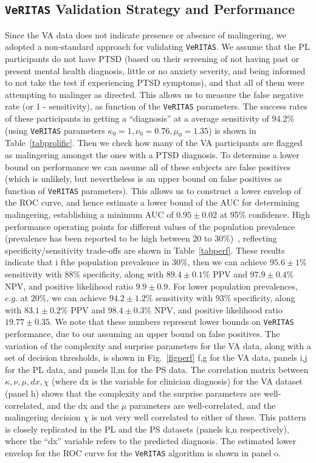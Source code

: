 \documentclass[onecolumn,10pt]{IEEEtran}
\def\vrts{\texttt{VeRITAS}\xspace}
\begin{document}
\subsection*{\vrts Validation Strategy and Performance}
Since the VA data does not indicate presence or absence of malingering, we adopted a non-standard approach for validating \vrts. We assume that the PL participants do not have PTSD (based on their screening of not having past or present mental health diagnosis, little or no anxiety severity, and being informed to not take the test if experiencing PTSD symptoms), and that all of them were attempting to malinger as directed. This allows us to  measure the false negative rate (or 1 - sensitivity), as function of the \vrts parameters. The success rates of these participants in getting a ``diagnosis'' at a average sensitivity of {\color{Red1} $94.2\%$} (using \vrts parameters $\kappa_0=1,\nu_0=0.76,\mu_0=1.35$) is shown in Table~\ref{tabprolific}. Then we check how many of the VA participants are flagged as malingering amongst the ones with a PTSD diagnosis. To determine a lower bound on performance we can assume all of these subjects are false positives (which is unlikely, but nevertheless is an upper bound on false positives as function of \vrts parameters). This allows us to construct a lower envelop of the ROC curve, and hence estimate a lower bound of the AUC for determining malingering, establishing a minimum AUC of {\color{Red1} $0.95 \pm 0.02$ at 95\% confidence}. High performance operating points for different values of the population prevalence (prevalence has been reported to be high between 20 to 30\%)~\cite{matto2019systematic}, reflecting specificity/sensitivity trade-offs are shown in Table~\ref{tabperf}. These results indicate that i fthe population prevalence in 30\%, then we can achieve {\color{Red1} $95.6 \pm 1 \%$ sensitivity with $88\%$ specificity, along with $89.4 \pm 0.1\%$ PPV and $97.9 \pm 0.4\%$ NPV, and positive likelihood ratio $9.9 \pm 0.9$. For lower population prevalences, $e.g.$ at $20\%$, we can achieve $94.2 \pm 1.2 \%$ sensitivity with $93\%$ specificity, along with $83.1 \pm 0.2\%$ PPV and $98.4 \pm 0.3\%$ NPV, and positive likelihood ratio $19.77 \pm 0.35$.} We note  that these numbers represent lower bounds on \vrts performance, due to our assuming an upper bound on false positives. The variation of the complexity and surprise parameters for the VA data, along with a set of decision thresholds, is shown in Fig.~\ref{figperf} f,g for the VA data,  panels i,j for the PL data, and panels ll,m for the PS data. The correlation matrix between $\kappa, \nu, \mu, dx, \chi$ (where dx is the variable for clinician diagnosis) for the VA dataset (panel h) shows that the complexity and the surprise parameters are well-correlated, and the dx and the $\mu$ parameters are well-correlated, and the malingering decision $\chi$ is not very well correlated to either of these. This pattern is closely replicated in the PL and the PS datasets (panels k,n respectively), where the ``dx'' variable  refers to the predicted diagnosis. The estimated lower envelop for the ROC curve for the \vrts algorithm is shown in panel o.
\end{document}
